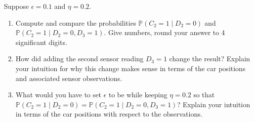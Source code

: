 \item {}
Suppose $\epsilon = 0.1$ and $\eta = 0.2$.

\begin{enumerate}
  \item Compute and compare the probabilities $\mathbb P(C_2 = 1 \mid D_2 = 0)$
  and $\mathbb P(C_2 = 1 \mid D_2 = 0, D_3 = 1)$. Give numbers, round your answer to 4 significant digits.
  
  \item How did adding the second sensor reading $D_3 = 1$ change the result?
  Explain your intuition for why this change makes sense in terms of the car
  positions and associated sensor observations.

  \item What would you have to set $\epsilon$ to be while keeping $\eta = 0.2$
  so that $\mathbb P(C_2 = 1 \mid D_2 = 0) = \mathbb P(C_2 = 1 \mid D_2 = 0, D_3
  = 1)$? Explain your intuition in terms of the car positions with respect to
  the observations.
\end{enumerate}
